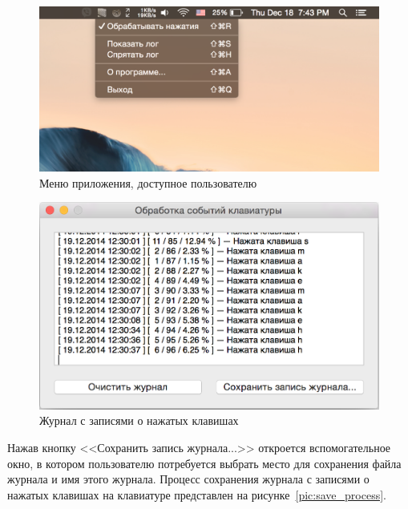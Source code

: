\begin{figure}[h!]
  \centering
  \includegraphics[width=130mm]{pic/statusbar.png}
  \caption{Меню приложения, доступное пользователю}
  \label{pic:statusbar}
\end{figure}

\begin{figure}[h!]
  \centering
  \includegraphics[width=130mm]{pic/log_window_in_work.png}
  \caption{Журнал с записями о нажатых клавишах}
  \label{pic:log_window_in_work}
\end{figure}

\newpage

Нажав кнопку <<Сохранить запись журнала...>> откроется вспомогательное окно,
в котором пользователю потребуется выбрать место для сохранения файла журнала
и имя этого журнала. Процесс сохранения журнала с записями о нажатых клавишах
на клавиатуре представлен на рисунке~\ref{pic:save_process}.

